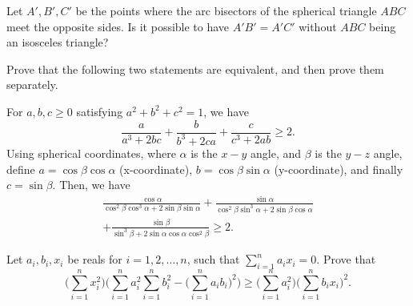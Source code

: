\documentclass[12pt,a4paper]{memoir}
\theoremstyle{definition}
\begin{document}
\begin{question}[name={Problem 2814 in Gazeta Matematica (Bucuresti)}]
	Let $A',B',C'$ be the points where the arc bisectors of the spherical triangle $ABC$ meet the opposite sides. Is it possible to have $A'B'=A'C'$ without $ABC$ being an isosceles triangle?
\end{question}




\begin{question}
	Prove that the following two statements are equivalent, and then prove them separately.
	\begin{tasks}
		\task  For $a,b,c \geq 0$ satisfying $a^2+b^2+c^2=1$, we have
		\[\frac{a}{a^3+2bc}+\frac{b}{b^3+2ca}+\frac{c}{c^3+2ab} \geq 2.\]
		\task Using spherical coordinates, where $\alpha$ is the $x-y$ angle, and $\beta$ is the $y-z$ angle, define $a = \cos \beta \cos \alpha$ (x-coordinate), $b = \cos \beta \sin \alpha$ (y-coordinate), and finally $c = \sin \beta$. Then, we have \begin{multline*}
			\frac{\cos \alpha}{\cos^2 \beta \cos^3 \alpha + 2 \sin \beta \sin \alpha} + \frac{\sin \alpha}{\cos^2 \beta \sin^3 \alpha + 2 \sin \beta \cos \alpha}\\ + \frac{\sin \beta}{\sin^3 \beta + 2 \sin \alpha \cos \alpha \cos^2 \beta}  \geq 2.
		\end{multline*}
	\end{tasks} 
\end{question}




\begin{question}[name={Cauchy--like Spherical Inequality by Fuzzylogic}]
	Let $a_i,b_i,x_i$ be reals for $i=1,2,\dots,n$, such that $\sum_{i=1}^na_ix_i=0$. Prove that
	\[ \bigg(\sum_{i=1}^n x_i^2\bigg) \bigg(\sum_{i=1}^na_i^2\sum_{i=1}^nb_i^2 - \big(\sum_{i=1}^na_ib_i\big)^2\bigg) \ge \bigg(\sum_{i=1}^na_i^2\bigg)\bigg(\sum_{i=1}^nb_ix_i\bigg)^2.  \]
\end{question}
\end{document}
